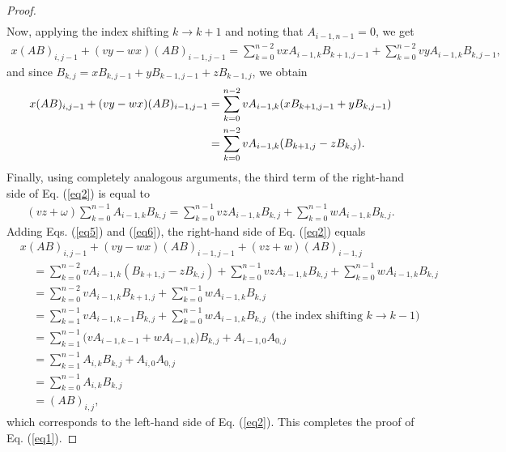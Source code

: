 \documentclass{amsart}
\begin{document}
\begin{proof}
\begin{align*}
\end{align*}
Now, applying the index shifting $k\rightarrow k+1$ and noting that $A_{i-1,n-1}=0$, we get
\begin{align*}
x(AB)_{i, j-1}+ (vy-wx) (AB)_{i-1, j-1}=\sum_{k=0}^{n-2} vx A_{i-1, k} B_{k+1,j-1}+\sum_{k=0}^{n-2} vy A_{i-1,k} B_{k, j-1},
\end{align*}
and since $B_{k, j}=xB_{k, j-1}+yB_{k-1, j-1}+zB_{k-1, j}$, we obtain
\begin{align}
x(AB)_{i, j-1}+ (vy-wx) (AB)_{i-1, j-1}&=\sum_{k=0}^{n-2}  vA_{i-1,k} (xB_{k+1,j-1}+yB_{k,j-1})\notag \\&=\sum_{k=0}^{n-2} vA_{i-1, k} (B_{k+1,j}-z B_{k, j}). \label{eq5}
\end{align}
Finally, using completely analogous arguments, the third term of the right-hand side of Eq. (\ref{eq2}) is equal to 
\begin{align}\label{eq6}
(vz+\omega)\sum_{k=0}^{n-1}  A_{i-1,k} B_{k, j}=\sum_{k=0}^{n-1} vz A_{i-1,k} B_{k, j}+\sum_{k=0}^{n-1} wA_{i-1,k} B_{k, j}. 
\end{align}
Adding Eqs. (\ref{eq5}) and (\ref{eq6}), the right-hand side of  Eq. (\ref{eq2}) equals 
\begin{align*}
& x(AB)_{i, j-1}+(vy-wx) (AB)_{i-1, j-1}+(vz+w) (AB)_{i-1, j}\\
&\ \ \ \ \ =\sum_{k=0}^{n-2} vA_{i-1,k} (B_{k+1, j}-zB_{k, j})+\sum_{k=0}^{n-1} vz A_{i-1,k} B_{k, j}+\sum_{k=0}^{n-1} wA_{i-1,k} B_{k, j}\\
&\ \ \ \ \ =\sum_{k=0}^{n-2}  vA_{i-1,k} B_{k+1, j}+\sum_{k=0}^{n-1} wA_{i-1,k} B_{k, j}\\
&\ \ \ \ \ =\sum_{k=1}^{n-1} vA_{i-1, k-1} B_{k, j}+\sum_{k=0}^{n-1} wA_{i-1, k} B_{k, j} \ \ \text{(the index shifting $k\rightarrow k-1$)}\\
&\ \ \ \ \ = \sum_{k=1}^{n-1}  \big(vA_{i-1,k-1}+ w A_{i-1, k}\big) B_{k, j}+A_{i-1, 0}A_{0, j}\\
&\ \ \ \ \ = \sum_{k=1}^{n-1}  A_{i, k} B_{k, j}+A_{i, 0}A_{0, j}\\
&\ \ \ \ \ = \sum_{k=0}^{n-1}  A_{i, k} B_{k, j}\\
&\ \ \ \ \ = (AB)_{i, j},
\end{align*}
which corresponds to the left-hand side of  Eq. (\ref{eq2}). This completes the proof of Eq. (\ref{eq1}).


\end{proof}
\end{document}
